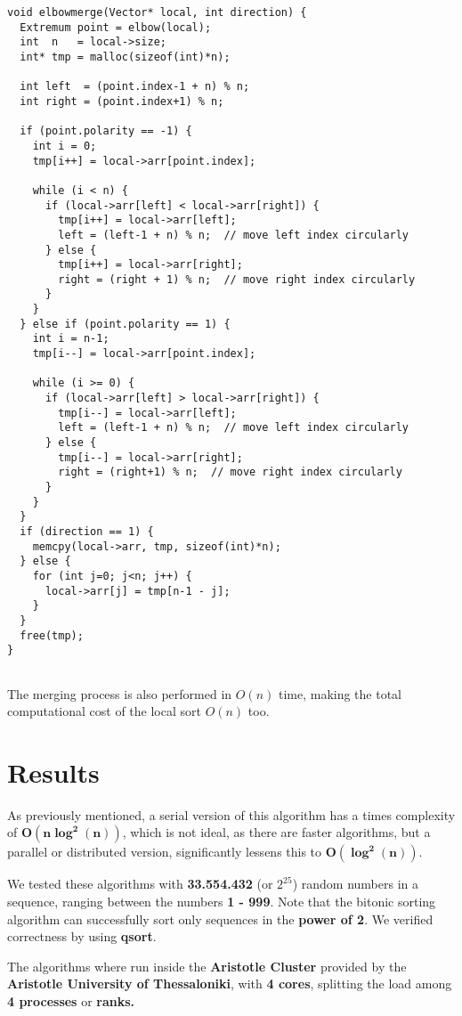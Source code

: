 \documentclass[12pt]{report}
\begin{document}
\begin{lstlisting}[style=cstyle]
void elbowmerge(Vector* local, int direction) {
  Extremum point = elbow(local);
  int  n   = local->size;
  int* tmp = malloc(sizeof(int)*n);

  int left  = (point.index-1 + n) % n;
  int right = (point.index+1) % n;

  if (point.polarity == -1) {  
    int i = 0;
    tmp[i++] = local->arr[point.index];  

    while (i < n) {
      if (local->arr[left] < local->arr[right]) {
        tmp[i++] = local->arr[left];
        left = (left-1 + n) % n;  // move left index circularly
      } else {
        tmp[i++] = local->arr[right];
        right = (right + 1) % n;  // move right index circularly
      }
    }
  } else if (point.polarity == 1) {  
    int i = n-1;
    tmp[i--] = local->arr[point.index];  

    while (i >= 0) {
      if (local->arr[left] > local->arr[right]) {
        tmp[i--] = local->arr[left];
        left = (left-1 + n) % n;  // move left index circularly
      } else {
        tmp[i--] = local->arr[right];
        right = (right+1) % n;  // move right index circularly
      }
    }
  }
  if (direction == 1) {
    memcpy(local->arr, tmp, sizeof(int)*n);
  } else {
    for (int j=0; j<n; j++) {
      local->arr[j] = tmp[n-1 - j];
    }
  }
  free(tmp);
}


\end{lstlisting}
The merging process is also performed in $O(n)$ time, making the total computational cost of the local sort $O(n)$ too.

\chapter{Results}
As previously mentioned, a serial version of this algorithm has a times complexity of \(\boldsymbol{O(n \log^2(n))}\), which is not ideal, as there are faster algorithms, but a parallel or distributed version, significantly lessens this to \(\boldsymbol{O(\log^2(n))}\).

We tested these algorithms with \textbf{33.554.432} (or $2^{25}$) random numbers in a sequence, ranging between the numbers \textbf{1 - 999}.  Note that the bitonic sorting algorithm can successfully sort only sequences in the \textbf{power of 2}. We verified correctness by using \textbf{qsort}.

The algorithms where run inside the \textbf{Aristotle Cluster} provided by the \textbf{Aristotle University of Thessaloniki}, with \textbf{4 cores}, splitting the load among \textbf{4 processes} or \textbf{ranks.}
\end{document}

